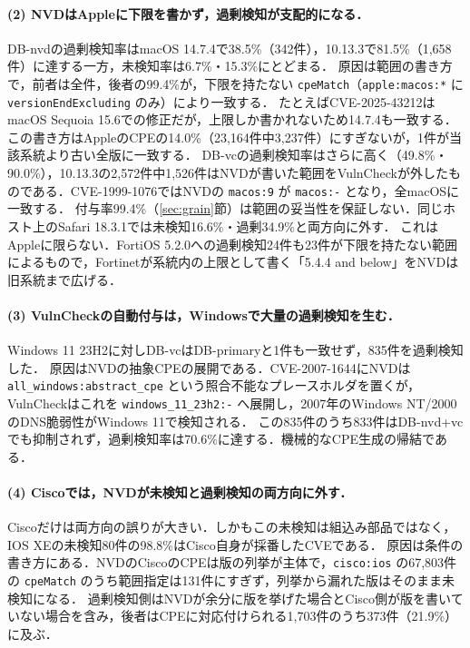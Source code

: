 \paragraph{(2) NVDはAppleに下限を書かず，過剰検知が支配的になる．}
DB-nvdの過剰検知率はmacOS 14.7.4で38.5\%（342件），10.13.3で81.5\%（1,658件）に達する一方，未検知率は6.7\%・15.3\%にとどまる．
原因は範囲の書き方で，前者は全件，後者の99.4\%が，下限を持たない \texttt{cpeMatch}（\texttt{apple:macos:*} に \texttt{versionEndExcluding} のみ）により一致する．
たとえばCVE-2025-43212はmacOS Sequoia 15.6での修正だが，上限しか書かれないため14.7.4も一致する．この書き方はAppleのCPEの14.0\%（23,164件中3,237件）にすぎないが，1件が当該系統より古い全版に一致する．
DB-vcの過剰検知率はさらに高く（49.8\%・90.0\%），10.13.3の2,572件中1,526件はNVDが書いた範囲をVulnCheckが外したものである．CVE-1999-1076ではNVDの \texttt{macos:9} が \texttt{macos:-} となり，全macOSに一致する．
付与率99.4\%（\ref{sec:grain}節）は範囲の妥当性を保証しない．同じホスト上のSafari 18.3.1では未検知16.6\%・過剰34.9\%と両方向に外す．
これはAppleに限らない．FortiOS 5.2.0への過剰検知24件も23件が下限を持たない範囲によるもので，Fortinetが系統内の上限として書く「5.4.4 and below」をNVDは旧系統まで広げる．

\paragraph{(3) VulnCheckの自動付与は，Windowsで大量の過剰検知を生む．}
Windows 11 23H2に対しDB-vcはDB-primaryと1件も一致せず，835件を過剰検知した．
原因はNVDの抽象CPEの展開である．CVE-2007-1644にNVDは \texttt{all\_windows:abstract\_cpe} という照合不能なプレースホルダを置くが，VulnCheckはこれを \texttt{windows\_11\_23h2:-} へ展開し，2007年のWindows NT/2000のDNS脆弱性がWindows 11で検知される．
この835件のうち833件はDB-nvd+vcでも抑制されず，過剰検知率は70.6\%に達する．機械的なCPE生成の帰結である\cite{vulncheck-cpe}．

\paragraph{(4) Ciscoでは，NVDが未検知と過剰検知の両方向に外す．}
Ciscoだけは両方向の誤りが大きい．しかもこの未検知は組込み部品ではなく，IOS XEの未検知80件の98.8\%はCisco自身が採番したCVEである．
原因は条件の書き方にある．NVDのCiscoのCPEは版の列挙が主体で，\texttt{cisco:ios} の67,803件の \texttt{cpeMatch} のうち範囲指定は131件にすぎず，列挙から漏れた版はそのまま未検知になる．
過剰検知側はNVDが余分に版を挙げた場合とCisco側が版を書いていない場合を含み，後者はCPEに対応付けられる1,703件のうち373件（21.9\%）に及ぶ．

